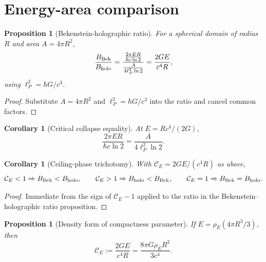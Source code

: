 \documentclass[11pt,a4paper]{article}
\newtheorem{proposition}[theorem]{Proposition}
\newtheorem{corollary}[theorem]{Corollary}
\begin{document}
\section{Energy-area comparison}

\begin{proposition}[Bekenstein-holographic ratio]
For a spherical domain of radius $R$ and area $A=4\pi R^2$,
\[
\frac{B_{\rm Bek}}{B_{\rm holo}}
=\frac{\frac{2\pi ER}{\hbar c\ln2}}{\frac{A}{4\ell_P^2\ln2}}
=\frac{2GE}{c^4R},
\]
using $\ell_P^2=\hbar G/c^3$.
\end{proposition}
\begin{proof}
Substitute $A=4\pi R^2$ and $\ell_P^2=\hbar G/c^3$ into the ratio and cancel common factors.\end{proof}

\begin{corollary}[Critical collapse equality]
At $E=Rc^4/(2G)$,
\[
\frac{2\pi ER}{\hbar c\ln2}=\frac{A}{4\ell_P^2\ln2}.
\]
\end{corollary}

\begin{corollary}[Ceiling-phase trichotomy]
With $\mathcal C_E=2GE/(c^4R)$ as above,
\[
\mathcal C_E<1\Rightarrow B_{\rm Bek}<B_{\rm holo},
\qquad
\mathcal C_E>1\Rightarrow B_{\rm holo}<B_{\rm Bek},
\qquad
\mathcal C_E=1\Rightarrow B_{\rm Bek}=B_{\rm holo}.
\]
\end{corollary}
\begin{proof}
Immediate from the sign of $\mathcal C_E-1$ applied to the ratio in the Bekenstein--holographic ratio proposition.\end{proof}

\begin{proposition}[Density form of compactness parameter]
If $E=\rho_E(4\pi R^3/3)$, then
\[
\mathcal C_E:=\frac{2GE}{c^4R}=\frac{8\pi G\rho_E R^2}{3c^4}.
\]
\end{proposition}
\end{document}
